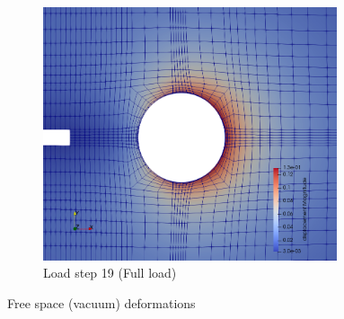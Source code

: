 \documentclass[11pt,a4paper,final]{article}
\begin{document}
\begin{figure}[h]
\begin{subfigure}[b]{0.32\textwidth}
\centering
\includegraphics[width=0.95\textwidth]{free_space_disp_19.png}
\caption{Load step 19 (Full load)}
\label{fig:1.10.3}
\end{subfigure}
\caption{Free space (vacuum) deformations}
\label{fig:1.10}
\end{figure}
\end{document}
